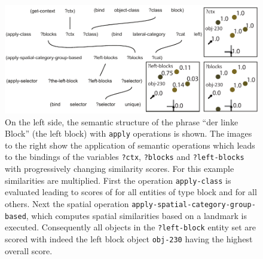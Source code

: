 \begin{figure}
\begin{center}
\includegraphics[width=1.0\columnwidth]{figs/semantic-structure-apply-der-linke-block}
\end{center}
\caption[Lenient categorization semantics]{
On the left side, the semantic structure of the phrase
``der linke Block'' (the left block) with {\footnotesize\tt apply} operations is shown. The images to
the right show the application of semantic operations which leads to the
bindings of the variables {\footnotesize\tt ?ctx}, {\footnotesize\tt ?blocks} and {\footnotesize\tt ?left-blocks}
with progressively changing similarity scores. For this example similarities are
multiplied. First the operation {\footnotesize\tt apply-class} is evaluated leading to
scores of for all entities of type block and
for all others. Next the spatial operation {\footnotesize\tt apply-spatial-category-group-based}, 
which computes spatial similarities based on a landmark is executed.
Consequently all objects in the {\footnotesize\tt ?left-block} entity set are scored with
indeed the left block object {\footnotesize\tt obj-230} having the highest
overall score.
}
\label{f:apply-operations}
\end{figure}


